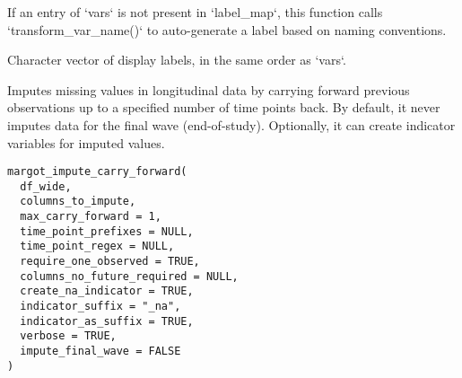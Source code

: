 \documentclass[a4paper]{book}
\begin{document}
%
\begin{Details}
If an entry of `vars` is not present in `label\_map`, this function
calls  `transform\_var\_name()` to auto-generate a label based on naming conventions.
\end{Details}
%
\begin{Value}
Character vector of display labels, in the same order as `vars`.
\end{Value}
%
\begin{Description}
Imputes missing values in longitudinal data by carrying forward previous observations
up to a specified number of time points back. By default, it never imputes data for the final wave
(end-of-study). Optionally, it can create indicator variables for imputed values.
\end{Description}
%
\begin{Usage}
\begin{verbatim}
margot_impute_carry_forward(
  df_wide,
  columns_to_impute,
  max_carry_forward = 1,
  time_point_prefixes = NULL,
  time_point_regex = NULL,
  require_one_observed = TRUE,
  columns_no_future_required = NULL,
  create_na_indicator = TRUE,
  indicator_suffix = "_na",
  indicator_as_suffix = TRUE,
  verbose = TRUE,
  impute_final_wave = FALSE
)
\end{verbatim}
\end{Usage}
%
\end{document}
